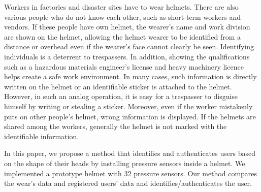 \documentclass[sigchi,authordraft]{acmart}
\begin{document}
Workers in factories and disaster sites have to wear helmets. There are also various people who do not know each other, such as short-term workers and vendors. If these people have own helmet, the wearer's name and work division are shown on the helmet, allowing the helmet wearer to be identified from a distance or overhead even if the wearer's face cannot clearly be seen. Identifying individuals is a deterrent to trespassers. In addition, showing the qualifications such as a hazardous materials engineer's license and heavy machinery licence helps create a safe work environment. In many cases, such information is directly written on the helmet or an identifiable sticker is attached to the helmet. However, in such an analog operation, it is easy for a trespasser to disguise himself by writing or stealing a sticker. Moreover, even if the worker mistakenly puts on other people's helmet, wrong information is displayed. If the helmets are shared among the workers, generally the helmet is not marked with the identifiable information.\par


In this paper, we propose a method that identifies and authenticates users based on the shape of their heads by installing pressure sensors inside a helmet. We implemented a prototype helmet with 32 pressure sensors. Our method compares the wear's data and registered users' data and identifies/authenticates the user.\par
\end{document}
